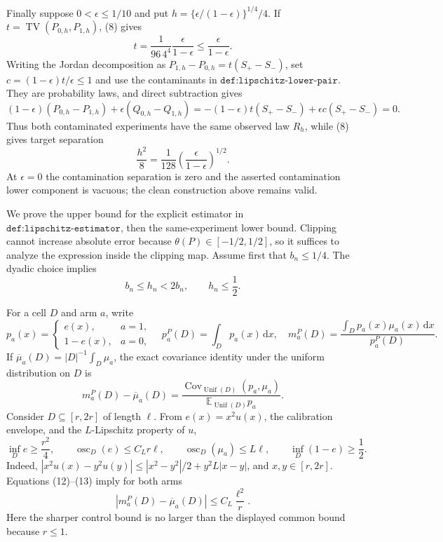 Finally suppose \(0<\epsilon\leq1/10\) and put \(h=\{\epsilon/(1-\epsilon)\}^{1/4}/4\).  If \(t=\operatorname{TV}(P_{0,h},P_{1,h})\), (8) gives
\[
 t=\frac{1}{96\,4^4}\frac{\epsilon}{1-\epsilon}
 \leq\frac{\epsilon}{1-\epsilon}.
\]
Writing the Jordan decomposition as \(P_{1,h}-P_{0,h}=t(S_+-S_-)\), set \(c=(1-\epsilon)t/\epsilon\leq1\) and use the contaminants in \(\texttt{def:lipschitz-lower-pair}\).  They are probability laws, and direct subtraction gives
\[
 (1-\epsilon)(P_{0,h}-P_{1,h})+\epsilon(Q_{0,h}-Q_{1,h})
 =-(1-\epsilon)t(S_+-S_-)+\epsilon c(S_+-S_-)=0.
\]
Thus both contaminated experiments have the same observed law \(R_h\), while (8) gives target separation
\[
 \frac{h^2}{8}=\frac1{128}\left(\frac{\epsilon}{1-\epsilon}\right)^{1/2}.
\]
At \(\epsilon=0\) the contamination separation is zero and the asserted contamination lower component is vacuous; the clean construction above remains valid.

We prove the upper bound for the explicit estimator in \(\texttt{def:lipschitz-estimator}\), then the same-experiment lower bound.  Clipping cannot increase absolute error because \(\theta(P)\in[-1/2,1/2]\), so it suffices to analyze the expression inside the clipping map.  Assume first that \(b_n\leq1/4\).  The dyadic choice implies
\[
 b_n\leq h_n<2b_n,\qquad h_n\leq\frac12. \tag{11}
\]

For a cell \(D\) and arm \(a\), write
\[
 p_a(x)=\begin{cases}e(x),&a=1,\\1-e(x),&a=0,\end{cases}
 \quad p_a^P(D)=\int_Dp_a(x)\,\mathrm dx,
 \quad m_a^P(D)=\frac{\int_Dp_a(x)\mu_a(x)\,\mathrm dx}{p_a^P(D)}.
\]
If \(\overline\mu_a(D)=|D|^{-1}\int_D\mu_a\), the exact covariance identity under the uniform distribution on \(D\) is
\[
 m_a^P(D)-\overline\mu_a(D)
 =\frac{\operatorname{Cov}_{\operatorname{Unif}(D)}(p_a,\mu_a)}
        {\mathbb E_{\operatorname{Unif}(D)}p_a}. \tag{12}
\]
Consider \(D\subseteq[r,2r]\) of length \(\ell\).  From \(e(x)=x^2u(x)\), the calibration envelope, and the \(L\)-Lipschitz property of \(u\),
\[
 \inf_D e\geq\frac{r^2}{4},\qquad
 \operatorname{osc}_D(e)\leq C_Lr\ell,\qquad
 \operatorname{osc}_D(\mu_a)\leq L\ell,\qquad
 \inf_D(1-e)\geq\frac12. \tag{13}
\]
Indeed, \(|x^2u(x)-y^2u(y)|\leq|x^2-y^2|/2+y^2L|x-y|\), and \(x,y\in[r,2r]\).  Equations (12)--(13) imply for both arms
\[
 |m_a^P(D)-\overline\mu_a(D)|\leq C_L\frac{\ell^2}{r}. \tag{14}
\]
Here the sharper control bound is no larger than the displayed common bound because \(r\leq1\).

